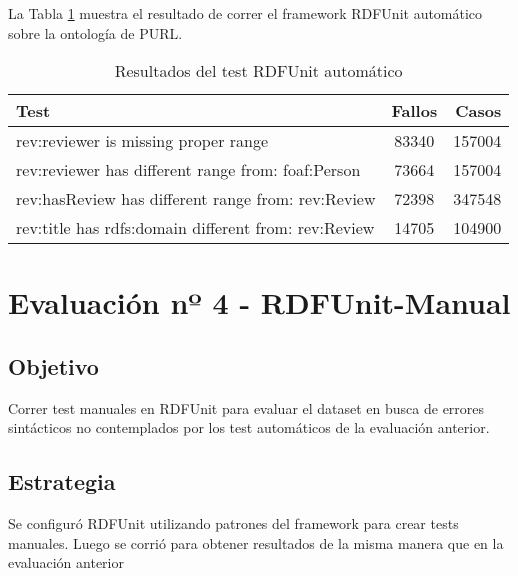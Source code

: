 La Tabla \ref{table:RDFUnitPurlAutomatic} muestra el resultado de correr el framework RDFUnit automático sobre la ontología de PURL.
\begin{table}[h]
\begin{tabular}{| l | c | r | }\hline
Test & Fallos & Casos \\\hline
 rev:reviewer is missing proper range & 83340 & 157004\\
 rev:reviewer has different range from: foaf:Person & 73664 & 157004\\
 rev:hasReview has different range from: rev:Review & 72398 & 347548\\
 rev:title has rdfs:domain different from: rev:Review & 14705 & 104900 \\ \hline
\end{tabular}
\caption{Resultados del test RDFUnit automático}
\label{table:RDFUnitPurlAutomatic}
\end{table}

\section{Evaluación nº 4 - RDFUnit-Manual}
\label{section:evaluacion-manual}

\subsection*{Objetivo} Correr test manuales en RDFUnit para evaluar el dataset en busca de errores sintácticos no contemplados por los test
automáticos de la evaluación anterior.

\subsection*{Estrategia} Se configuró RDFUnit utilizando patrones del framework para crear tests manuales. Luego se corrió para obtener resultados
de la misma manera que en la evaluación anterior

